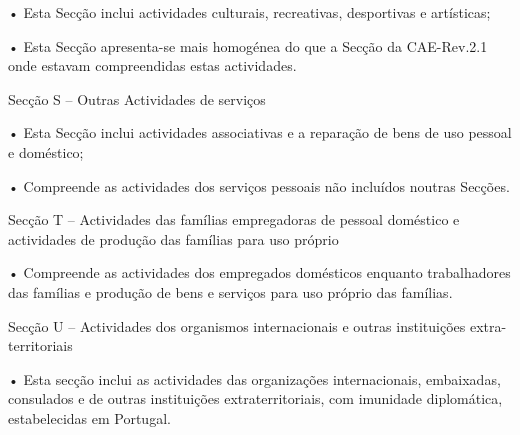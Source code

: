         • Esta Secção inclui actividades culturais, recreativas, desportivas e artísticas;

        • Esta Secção apresenta-se mais homogénea do que a Secção da CAE-Rev.2.1 onde estavam
          compreendidas estas actividades.

Secção S – Outras Actividades de serviços

        • Esta Secção inclui actividades associativas e a reparação de bens de uso pessoal e doméstico;

        • Compreende as actividades dos serviços pessoais não incluídos noutras Secções.

Secção T – Actividades das famílias empregadoras de pessoal doméstico e actividades de produção
das famílias para uso próprio

        • Compreende as actividades dos empregados domésticos enquanto trabalhadores das famílias e
          produção de bens e serviços para uso próprio das famílias.

Secção U – Actividades dos organismos internacionais e outras instituições extra-territoriais


        • Esta secção inclui as actividades das organizações internacionais, embaixadas, consulados e de
          outras instituições extraterritoriais, com imunidade diplomática, estabelecidas em Portugal.
